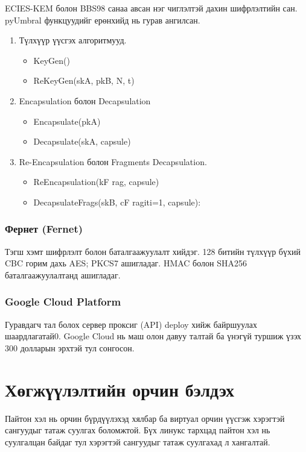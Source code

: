 ECIES-KEM болон BBS98 санаа авсан нэг чиглэлтэй дахин шифрлэлтийн сан. pyUmbral функцуудийг ерөнхийд нь гурав ангилсан.
\begin{enumerate}
    \item Түлхүүр үүсгэх алгоритмууд.
    \begin{itemize}
        \item KeyGen()
        \item ReKeyGen(skA, pkB, N, t)
    \end{itemize}
    \item Encapsulation болон Decapsulation
    \begin{itemize}
        \item Encapsulate(pkA)
        \item Decapsulate(skA, capsule)
    \end{itemize}
    \item Re-Encapsulation болон Fragments Decapsulation.
    \begin{itemize}
        \item ReEncapsulation(kF rag, capsule)
        \item DecapsulateFrags(skB, {cF ragi}ti=1, capsule):
    \end{itemize}
\end{enumerate}

\subsubsection*{\textbf{Фернет (Fernet)}}
Тэгш хэмт шифрлэлт  болон баталгаажуулалт хийдэг. 128 битийн түлхүүр бүхий CBC горим дахь AES; PKCS7 ашигладаг. HMAC болон SHA256 баталгаажуулалтанд ашигладаг.

\subsubsection*{\textbf{Google Cloud Platform}}
Гуравдагч тал болох сервер проксиг (API) deploy хийж байршуулах шаардлагатай0. Google Cloud нь маш олон давуу талтай ба үнэгүй туршиж үзэх 300 долларын эрхтэй тул сонгосон.

\section{Хөгжүүлэлтийн орчин бэлдэх}
Пайтон хэл нь орчин бүрдүүлэхэд хялбар ба виртуал орчин үүсгэж хэрэгтэй сангуудыг татаж суулгах боломжтой. Бүх линукс тархцад пайтон хэл нь суулгалцан байдаг тул хэрэгтэй сангуудыг татаж суулгахад л хангалтай.

